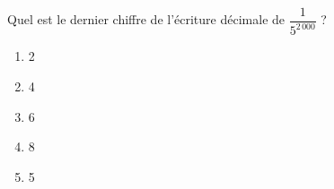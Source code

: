 Quel est le dernier chiffre de l'écriture décimale de $\dfrac1{5^{2\,000}}$ ?
\begin{multicols}{5}
  \begin{enumerate}[A/]
  \item 2
  \item 4
  \item 6
  \item 8
  \item 5
  \end{enumerate}
\end{multicols}